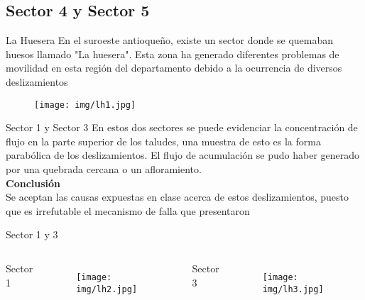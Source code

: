 \documentclass[11pt]{beamer}
\begin{document}
\subsection{Sector 4 y Sector 5}

\begin{frame}{La Huesera}
	En el suroeste antioqueño, existe un sector donde se quemaban huesos llamado "La huesera". Esta zona ha generado diferentes problemas de movilidad en esta región del departamento debido a la ocurrencia de diversos deslizamientos
	
	\begin{figure}
		\texttt{[image: img/lh1.jpg]}
	\end{figure}
\end{frame}

\begin{frame}{Sector 1 y Sector 3}
	En estos dos sectores se puede evidenciar la concentración de flujo en la parte superior de los taludes, una muestra de esto es la forma parabólica de los deslizamientos. El flujo de acumulación se pudo haber generado por una quebrada cercana o un afloramiento.\\
	\vspace{5mm}
	\textbf{\large{Conclusión}}\\
	 
	Se aceptan las causas expuestas en clase acerca de estos deslizamientos, puesto que es irrefutable el mecanismo de falla que presentaron
\end{frame}

\begin{frame}{Sector 1 y 3}
	\begin{columns}[t]
	Sector 1
	\begin{figure}
		\texttt{[image: img/lh2.jpg]}
	\end{figure}
	
	Sector 3
	\begin{figure}
		\texttt{[image: img/lh3.jpg]}
	\end{figure}
	\end{columns}
\end{frame}
\end{document}
